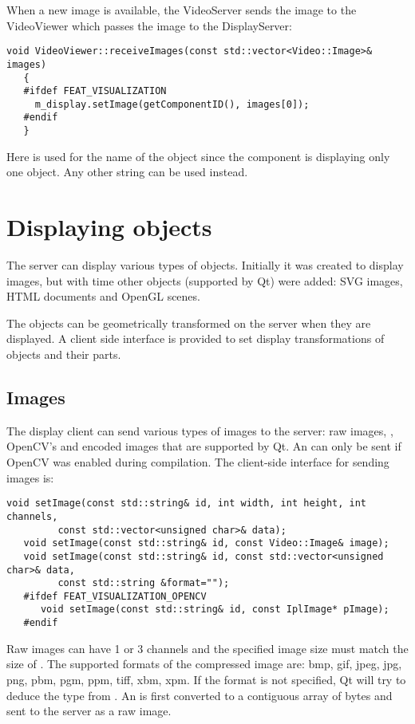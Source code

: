 When a new image is available, the VideoServer sends the image to the VideoViewer which
passes the image to the DisplayServer:

\begin{Verbatim}[fontsize=\scriptsize,gobble=3]
   void VideoViewer::receiveImages(const std::vector<Video::Image>& images)
   {
   #ifdef FEAT_VISUALIZATION
     m_display.setImage(getComponentID(), images[0]);
   #endif
   }
\end{Verbatim}

Here  is used for the name of the object since the component
is displaying only one object. Any other string can be used instead.


\section{Displaying objects}

The server can display various types of objects. Initially it was created to
display images, but with time other objects (supported by Qt) were added:
SVG images, HTML documents and OpenGL scenes.

The objects can be geometrically transformed on the server when they are
displayed. A client side interface is provided to set display transformations
of objects and their parts.

\subsection{Images}

The display client can send various types of images to the server: raw images, 
, OpenCV's  and encoded images that are
supported by Qt. An  can only be sent if OpenCV was enabled
during compilation.
The client-side interface for sending images is:

\begin{Verbatim}[fontsize=\scriptsize,gobble=3]
   void setImage(const std::string& id, int width, int height, int channels,
         const std::vector<unsigned char>& data);
   void setImage(const std::string& id, const Video::Image& image); 
   void setImage(const std::string& id, const std::vector<unsigned char>& data,
         const std::string &format=""); 
   #ifdef FEAT_VISUALIZATION_OPENCV
      void setImage(const std::string& id, const IplImage* pImage); 
   #endif
\end{Verbatim}

Raw images can have 1 or 3 channels and the specified image size must match the
size of . The supported formats of the compressed image are: bmp,
gif, jpeg, jpg, png, pbm, pgm, ppm, tiff, xbm, xpm. If the format is not
specified, Qt will try to deduce the type from . An 
is first converted to a contiguous array of bytes and sent to the server as a
raw image.
 
